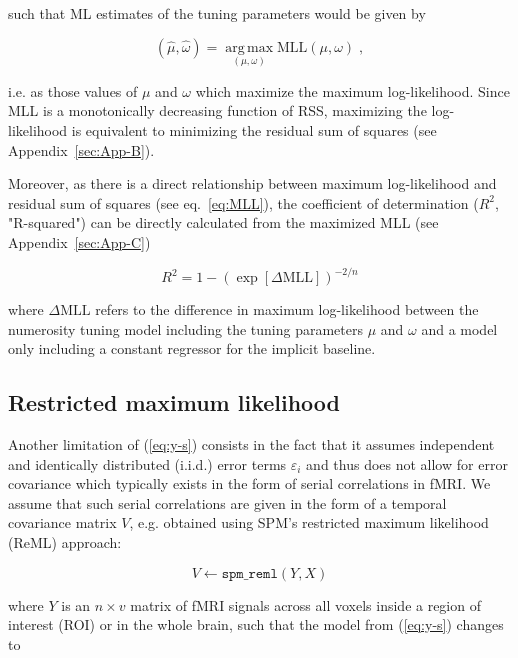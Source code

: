 \documentclass[a4paper,12pt]{article}
\begin{document}
such that ML estimates of the tuning parameters would be given by

\begin{equation} \label{eq:mu-tw-est-ML}
(\hat{\mu},\hat{\omega}) = \operatorname*{arg\,max}_{(\mu,\omega)} \mathrm{MLL}(\mu,\omega) \; ,
\end{equation}

i.e. as those values of $\mu$ and $\omega$ which maximize the maximum log-likelihood. Since MLL is a monotonically decreasing function of RSS, maximizing the log-likelihood is equivalent to minimizing the residual sum of squares (see Appendix~\ref{sec:App-B}).

Moreover, as there is a direct relationship between maximum log-likelihood and residual sum of squares (see eq.~\ref{eq:MLL}), the coefficient of determination ($R^2$, "R-squared") can be directly calculated from the maximized MLL (see Appendix~\ref{sec:App-C})

\begin{equation} \label{eq:R2-MLL}
R^2 = 1 - \left( \exp[\Delta\mathrm{MLL}] \right)^{-2/n}
\end{equation}

where $\Delta\mathrm{MLL}$ refers to the difference in maximum log-likelihood between the numerosity tuning model including the tuning parameters $\mu$ and $\omega$ and a model only including a constant regressor for the implicit baseline.


\pagebreak
\subsection{Restricted maximum likelihood}

Another limitation of (\ref{eq:y-s}) consists in the fact that it assumes independent and identically distributed (i.i.d.) error terms $\varepsilon_i$ and thus does not allow for error covariance which typically exists in the form of serial correlations in fMRI. We assume that such serial correlations are given in the form of a temporal covariance matrix $V$, e.g. obtained using SPM's restricted maximum likelihood (ReML) approach:

\begin{equation} \label{eq:ReML}
V \leftarrow \mathtt{spm\_reml}(Y, X)
\end{equation}

where $Y$ is an $n \times v$ matrix of fMRI signals across all voxels inside a region of interest (ROI) or in the whole brain, such that the model from (\ref{eq:y-s}) changes to
\end{document}

